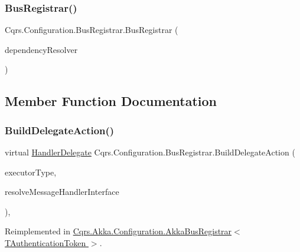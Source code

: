 \subsubsection{\texorpdfstring{Bus\+Registrar()}{BusRegistrar()}}
{\footnotesize\ttfamily Cqrs.\+Configuration.\+Bus\+Registrar.\+Bus\+Registrar (\begin{DoxyParamCaption}\item[{\hyperlink{interfaceCqrs_1_1Configuration_1_1IDependencyResolver}{I\+Dependency\+Resolver}}]{dependency\+Resolver }\end{DoxyParamCaption})}



\subsection{Member Function Documentation}
\mbox{\label{classCqrs_1_1Configuration_1_1BusRegistrar_a07d27088739f2ae0ac7c551fc6a72ac9_a07d27088739f2ae0ac7c551fc6a72ac9}} 
\subsubsection{\texorpdfstring{Build\+Delegate\+Action()}{BuildDelegateAction()}}
{\footnotesize\ttfamily virtual \hyperlink{classCqrs_1_1Configuration_1_1HandlerDelegate}{Handler\+Delegate} Cqrs.\+Configuration.\+Bus\+Registrar.\+Build\+Delegate\+Action (\begin{DoxyParamCaption}\item[{Type}]{executor\+Type,  }\item[{Func$<$ Type, I\+Enumerable$<$ Type $>$$>$}]{resolve\+Message\+Handler\+Interface }\end{DoxyParamCaption})\hspace{0.3cm}{\ttfamily [protected]}, {\ttfamily [virtual]}}



Reimplemented in \hyperlink{classCqrs_1_1Akka_1_1Configuration_1_1AkkaBusRegistrar_ad7e3e5d332d5b4d781375a28f23bdb19_ad7e3e5d332d5b4d781375a28f23bdb19}{Cqrs.\+Akka.\+Configuration.\+Akka\+Bus\+Registrar$<$ T\+Authentication\+Token $>$}.


